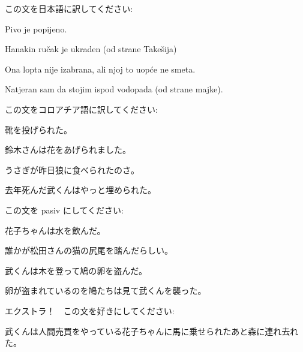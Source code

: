
\author{Katja Kržišnik}

	
	\begin{mondai}{この文を日本語に訳してください:}
		\item Pivo je popijeno.
		\item Hanakin ručak je ukraden (od strane Takešija)
		\item Ona lopta nije izabrana, ali njoj to uopće ne smeta.
		\item Natjeran sam da stojim ispod vodopada (od strane majke). 
	\end{mondai}
	
	\begin{mondai}{この文をコロアチア語に訳してください:}
		\item 靴を投げられた。 
		\item 鈴木さんは花をあげられました。
		\item うさぎが昨日狼に食べられたのさ。
		\item 去年死んだ武くんはやっと埋められた。
	\end{mondai}
	
	\begin{mondai}{この文を pasiv にしてください:}
		\item 花子ちゃんは水を飲んだ。
		\item 誰かが松田さんの猫の尻尾を踏んだらしい。
		\item 武くんは木を登って鳩の卵を盗んだ。
		\item 卵が盗まれているのを鳩たちは見て武くんを襲った。
	\end{mondai}
	
	\begin{mondai}{ エクストラ！　この文を好きにしてください: }
		\item 武くんは人間売買をやっている花子ちゃんに馬に乗せられたあと森に連れ去れた。  
	\end{mondai}
